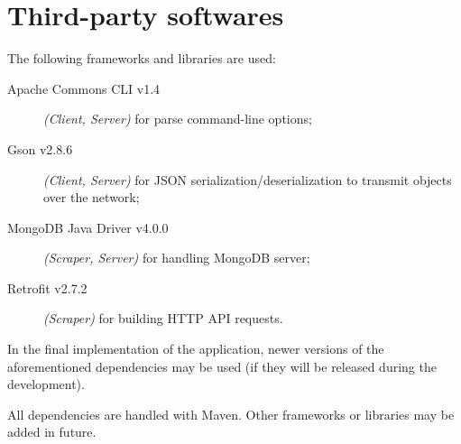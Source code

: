 \section{Third-party softwares}\label{sec:dependencies}

The following frameworks and libraries are used:
\begin{description}
	\item[Apache Commons CLI v1.4] \textit{(Client, Server)} for parse
		command-line options;
	\item[Gson v2.8.6] \textit{(Client, Server)} for JSON
		serialization/deserialization to transmit objects over the
		network;
	\item[MongoDB Java Driver v4.0.0] \textit{(Scraper, Server)} for
		handling MongoDB server;
	\item[Retrofit v2.7.2] \textit{(Scraper)} for building HTTP API
		requests.
\end{description}

In the final implementation of the application, newer versions of the
aforementioned dependencies may be used (if they will be released during the
development).

All dependencies are handled with Maven. Other frameworks or libraries may be
added in future.
